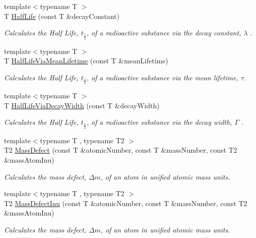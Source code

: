 \begin{DoxyCompactItemize}
{\footnotesize template$<$typename T $>$ }\\T \mbox{\hyperlink{group___e_g_x_phys-_half_life_ga21d268f154fb91c1c556bbfa7fe83ac1}{Half\+Life}} (const T \&decay\+Constant)
\begin{DoxyCompactList}\small\item\em Calculates the Half Life, $t_{\frac{1}{2}}$, of a radioactive substance via the decay constant, $\lambda$ . \end{DoxyCompactList}\item 
{\footnotesize template$<$typename T $>$ }\\T \mbox{\hyperlink{group___e_g_x_phys-_half_life_gacddef16b62e98b214ec8dd8af7da7dce}{Half\+Life\+Via\+Mean\+Lifetime}} (const T \&mean\+Lifetime)
\begin{DoxyCompactList}\small\item\em Calculates the Half Life, $t_{\frac{1}{2}}$, of a radioactive substance via the mean lifetime, $\tau$. \end{DoxyCompactList}\item 
{\footnotesize template$<$typename T $>$ }\\T \mbox{\hyperlink{group___e_g_x_phys-_half_life_gaba3fda944d1a68ee1016a1f2f5809359}{Half\+Life\+Via\+Decay\+Width}} (const T \&decay\+Width)
\begin{DoxyCompactList}\small\item\em Calculates the Half Life, $t_{\frac{1}{2}}$, of a radioactive substance via the decay width, $\Gamma$ . \end{DoxyCompactList}\item 
{\footnotesize template$<$typename T , typename T2 $>$ }\\T2 \mbox{\hyperlink{group___e_g_x_phys-_mass_defect_gae89f2dfa65992c0314adc2440b2f582a}{Mass\+Defect}} (const T \&atomic\+Number, const T \&mass\+Number, const T2 \&mass\+Atom\+Inu)
\begin{DoxyCompactList}\small\item\em Calculates the mass defect, $\Delta m$, of an atom in unified atomic mass units. \end{DoxyCompactList}\item 
{\footnotesize template$<$typename T , typename T2 $>$ }\\T2 \mbox{\hyperlink{group___e_g_x_phys-_mass_defect_ga70400004a5cb622de372ab84670731ef}{Mass\+Defect\+Inu}} (const T \&atomic\+Number, const T \&mass\+Number, const T2 \&mass\+Atom\+Inu)
\begin{DoxyCompactList}\small\item\em Calculates the mass defect, $\Delta m$, of an atom in unified atomic mass units. \end{DoxyCompactList}\item 

\end{DoxyCompactItemize}
